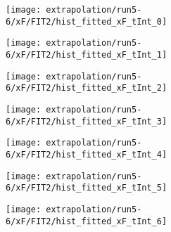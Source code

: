 \begin{figure}
\centering
\caption{Fit to the flask subtracted yield ratio with FIT2 for $x_F$ for run 5-6.}
\label{fig:run5-6_FIT2_xF}
\begin{subfigure}{0.45\linewidth}
\texttt{[image: extrapolation/run5-6/xF/FIT2/hist\_fitted\_xF\_tInt\_0]}
\end{subfigure}
\begin{subfigure}{0.45\linewidth}
\texttt{[image: extrapolation/run5-6/xF/FIT2/hist\_fitted\_xF\_tInt\_1]}
\end{subfigure}
\begin{subfigure}{0.45\linewidth}
\texttt{[image: extrapolation/run5-6/xF/FIT2/hist\_fitted\_xF\_tInt\_2]}
\end{subfigure}
\begin{subfigure}{0.45\linewidth}
\texttt{[image: extrapolation/run5-6/xF/FIT2/hist\_fitted\_xF\_tInt\_3]}
\end{subfigure}
\begin{subfigure}{0.45\linewidth}
\texttt{[image: extrapolation/run5-6/xF/FIT2/hist\_fitted\_xF\_tInt\_4]}
\end{subfigure}
\begin{subfigure}{0.45\linewidth}
\texttt{[image: extrapolation/run5-6/xF/FIT2/hist\_fitted\_xF\_tInt\_5]}
\end{subfigure}
\begin{subfigure}{0.45\linewidth}
\texttt{[image: extrapolation/run5-6/xF/FIT2/hist\_fitted\_xF\_tInt\_6]}
\end{subfigure}
\end{figure}
